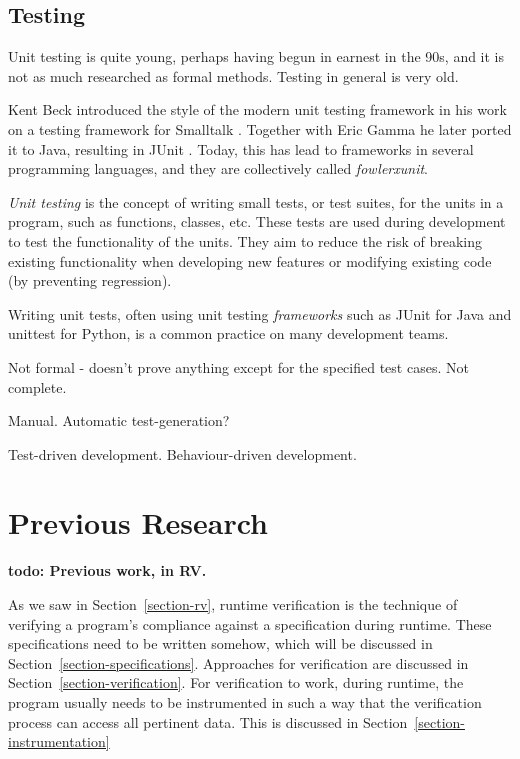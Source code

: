 \documentclass[a4paper,11pt]{kth-mag}
\newcommand{\todo}[1]{\textbf{todo: #1}}
\begin{document}
\section{Testing}

Unit testing is quite young, perhaps having begun in earnest in the 90s, and it
is not as much researched as formal methods. Testing in general is very old.

Kent Beck introduced the style of the modern unit testing framework in his work
on a testing framework  for Smalltalk \cite{becksmalltalktesting}.  Together
with Eric Gamma he later ported it to Java, resulting in JUnit \cite{junit}.
Today, this has lead to frameworks in several programming languages, and they
are collectively called \textit{fowlerxunit}.

\textit{Unit testing} is the concept of writing small tests, or test suites,
for the units in a program, such as functions, classes, etc. These tests are
used during development to test the functionality of the units. They aim to
reduce the risk of breaking existing functionality when developing new features
or modifying existing code (by preventing regression).

Writing unit tests, often using unit testing \textit{frameworks} such as JUnit
\cite{junit} for Java and unittest \cite{python-unittest} for Python, is a
common practice on many development teams.

Not formal - doesn't prove anything except for the specified test cases. Not
complete.

Manual. Automatic test-generation?

Test-driven development. Behaviour-driven development.





\pagestyle{newchap}
\chapter{Previous Research} \label{chapter-previous-research}

\todo{Previous work, in RV.}

As we saw in Section~\ref{section-rv}, runtime verification is the technique of
verifying a program's compliance against a specification during runtime. These
specifications need to be written somehow, which will be discussed in
Section~\ref{section-specifications}. Approaches for verification are discussed
in Section~\ref{section-verification}. For verification to work, during
runtime,
the program usually needs to be instrumented in such a way that the
verification process can access all pertinent data. This is discussed in
Section~\ref{section-instrumentation}
\end{document}
